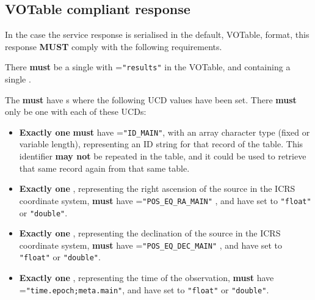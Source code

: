 \documentclass[11pt,a4paper]{ivoa} 
\begin{document}
\subsection{VOTable compliant response}

In the case the service response is serialised in the default, VOTable,
format, this response \textbf{MUST} comply with the following
requirements.

There \textbf{must} be a single  with
=\texttt{"results"} in
the VOTable, and containing a single .

The  \textbf{must} have s where the following
UCD values have been set. There \textbf{must} only be one 
with each of these UCDs: \begin{itemize} \item \textbf{Exactly one}
 \textbf{must} have =\texttt{"ID\_MAIN"}, with
an array character type (fixed or variable length), representing an ID
string for that record of the table. This identifier \textbf{may not} be
repeated in the table, and it could be used to retrieve that same record
again from that same table.  \item \textbf{Exactly one} ,
representing the right ascension of the source in the ICRS coordinate
system, \textbf{must} have =\texttt{"POS\_EQ\_RA\_MAIN"}
, and have
 set to \texttt{"float"} or \texttt{"double"}.  \item
\textbf{Exactly one} , representing the declination of the
source in the ICRS coordinate system, \textbf{must} have
=\texttt{"POS\_EQ\_DEC\_MAIN"} , and have  set to \texttt{"float"}
or \texttt{"double"}.  \item \textbf{Exactly one} ,
representing the time of the observation, \textbf{must} have
=\texttt{"time.epoch;meta.main"}, and have 
set to \texttt{"float"} or \texttt{"double"}. 

\end{itemize}
\end{document}
